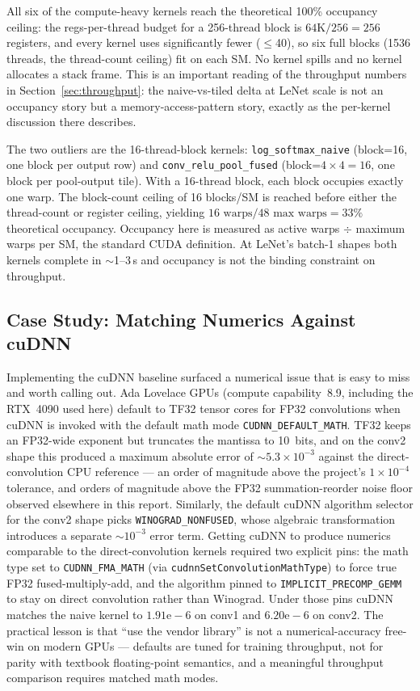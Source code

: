 \documentclass[conference]{IEEEtran}
\begin{document}
All six of the compute-heavy kernels reach the theoretical 100\%
occupancy ceiling: the regs-per-thread budget for a 256-thread block
is \(64\text{K}/256=256\) registers, and every kernel uses
significantly fewer ($\le$40), so six full blocks (1536 threads, the
thread-count ceiling) fit on each SM. No kernel spills and no kernel
allocates a stack frame. This is an important reading of the
throughput numbers in Section~\ref{sec:throughput}: the naive-vs-tiled delta at
LeNet scale is not an occupancy story but a memory-access-pattern
story, exactly as the per-kernel discussion there describes.

The two outliers are the 16-thread-block kernels:
\texttt{log\_softmax\_naive} (block=16, one block per output row)
and \texttt{conv\_relu\_pool\_fused} (block=$4{\times}4=16$, one
block per pool-output tile).
With a 16-thread block, each block occupies exactly one warp.
The block-count ceiling of 16 blocks/SM is reached before either
the thread-count or register ceiling, yielding
$16\text{ warps}/48\text{ max warps} = 33\%$ theoretical occupancy.
Occupancy here is measured as active warps $\div$ maximum warps
per SM, the standard CUDA definition. At LeNet's batch-1 shapes
both kernels complete in $\sim$1--3\,\textmu s and occupancy is
not the binding constraint on throughput.

\subsection{Case Study: Matching Numerics Against cuDNN}
\label{sec:cudnn}
Implementing the cuDNN baseline surfaced a numerical issue that is
easy to miss and worth calling out. Ada Lovelace GPUs (compute capability~8.9,
including the RTX~4090 used here) default to TF32 tensor cores for
FP32 convolutions when cuDNN is invoked with the default math mode
\texttt{CUDNN\_DEFAULT\_MATH}. TF32 keeps an FP32-wide exponent but
truncates the mantissa to 10~bits, and on the conv2 shape this
produced a maximum absolute error of $\sim\!5.3\times10^{-3}$ against
the direct-convolution CPU reference --- an order of magnitude above
the project's $1\times10^{-4}$ tolerance, and orders of magnitude
above the FP32 summation-reorder noise floor observed elsewhere in
this report. Similarly, the default cuDNN algorithm selector for the
conv2 shape picks \texttt{WINOGRAD\_NONFUSED}, whose algebraic
transformation introduces a separate $\sim\!10^{-3}$ error term.
Getting cuDNN to produce numerics comparable to the direct-convolution
kernels required two explicit pins: the math type set to
\texttt{CUDNN\_FMA\_MATH} (via \texttt{cudnnSetConvolutionMathType})
to force true FP32 fused-multiply-add, and the algorithm pinned to
\texttt{IMPLICIT\_PRECOMP\_GEMM} to stay on direct convolution
rather than Winograd. Under those pins cuDNN
matches the naive kernel to $1.91\mathrm{e}{-}6$ on conv1 and
$6.20\mathrm{e}{-}6$ on conv2. The practical lesson is that
``use the vendor library'' is not a numerical-accuracy free-win on
modern GPUs --- defaults are tuned for training throughput, not for
parity with textbook floating-point semantics, and a meaningful
throughput comparison requires matched math modes.
\end{document}
